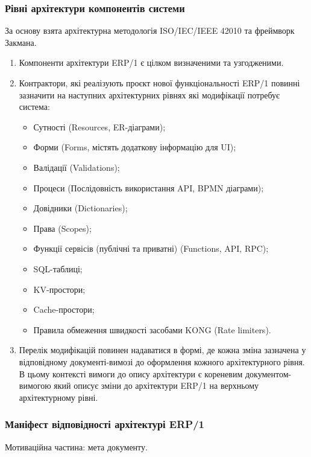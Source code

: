 \documentclass{article}
\begin{document}
\subsubsection{Рівні архітектури компонентів системи}

За основу взята архітектурна методологія ISO/IEC/IEEE 42010 та фреймворк Закмана.

\begin{enumerate}
  \item Компоненти архітектури ERP/1 є цілком визначеними та узгодженими.
  \item Контрактори, які реалізують проєкт нової функціональності ERP/1 повинні зазначити на
        наступних архітектурних рівнях які модифікації потребує система:
    \begin{itemize}
      \item Сутності (Resources, ER-діаграми);
      \item Форми (Forms, містять додаткову інформацію для UI);
      \item Валідації (Validations);
      \item Процеси (Послідовність використання API, BPMN діаграми);
      \item Довідники (Dictionaries);
      \item Права (Scopes);
      \item Функції сервісів (публічні та приватні) (Functions, API, RPC);
      \item SQL-таблиці;
      \item KV-простори;
      \item Cache-простори;
      \item Правила обмеження швидкості засобами KONG (Rate limiters).
    \end{itemize}
  \item Перелік модифікацій повинен надаватися в формі, де кожна зміна зазначена у відповідному
        документі-вимозі до оформлення кожного архітектурного рівня. В цьому контексті вимоги
        до опису архітектури є кореневим документом-вимогою який описує зміни до архітектури ERP/1
        на верхньому архітектурному рівні.
\end{enumerate}

\newpage
\subsubsection{Маніфест відповідності архітектурі ERP/1}

Мотиваційна частина: мета документу.
\end{document}
